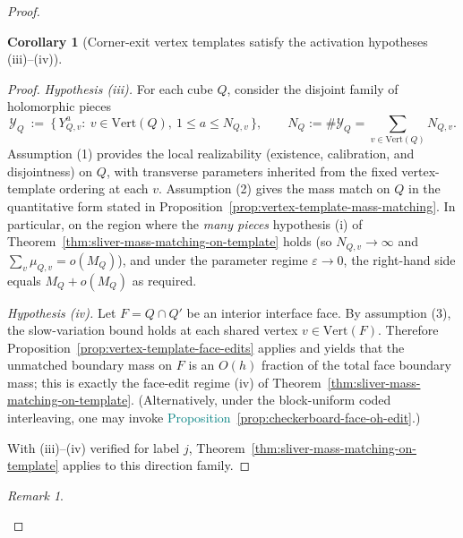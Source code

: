 \documentclass[11pt]{article}
\newcommand{\REVMZ}[1]{\textcolor{teal}{#1}}  %
\numberwithin{equation}{section}  %
\theoremstyle{plain}
\newtheorem{corollary}[theorem]{Corollary}
\theoremstyle{definition}
\theoremstyle{remark}
\newtheorem{remark}[theorem]{Remark}
\begin{document}
\begin{proof}
\begin{corollary}[Corner-exit vertex templates satisfy the activation hypotheses (iii)--(iv)]
\end{corollary}
\begin{proof}

\emph{Hypothesis \textnormal{(iii)}.}
For each cube $Q$, consider the disjoint family of holomorphic pieces
\[
\mathcal Y_Q\ :=\ \{\,Y_{Q,v}^a:\ v\in\mathrm{Vert}(Q),\ 1\le a\le N_{Q,v}\,\},
\qquad N_Q:=\#\mathcal Y_Q=\sum_{v\in\mathrm{Vert}(Q)}N_{Q,v}.
\]
Assumption \textnormal{(1)} provides the local realizability (existence, calibration, and disjointness) on $Q$,
with transverse parameters inherited from the fixed vertex-template ordering at each $v$.
Assumption \textnormal{(2)} gives the mass match on $Q$ in the quantitative form stated in
Proposition~\ref{prop:vertex-template-mass-matching}.
In particular, on the region where the \emph{many pieces} hypothesis \textnormal{(i)} of
Theorem~\ref{thm:sliver-mass-matching-on-template} holds (so $N_{Q,v}\to\infty$ and $\sum_v\mu_{Q,v}=o(M_Q)$),
and under the parameter regime $\varepsilon\to 0$, the right-hand side equals $M_Q+o(M_Q)$ as required.

\emph{Hypothesis \textnormal{(iv)}.}
Let $F=Q\cap Q'$ be an interior interface face.
By assumption \textnormal{(3)}, the slow-variation bound holds at each shared vertex $v\in\mathrm{Vert}(F)$.
Therefore Proposition~\ref{prop:vertex-template-face-edits} applies and yields that the unmatched boundary mass on $F$
is an $O(h)$ fraction of the total face boundary mass; this is exactly the face-edit regime \textnormal{(iv)} of
Theorem~\ref{thm:sliver-mass-matching-on-template}.
(Alternatively, under the block-uniform coded interleaving, one may invoke \REVMZ{Proposition~\ref{prop:checkerboard-face-oh-edit}}.)

With \textnormal{(iii)}--\textnormal{(iv)} verified for label $j$, Theorem~\ref{thm:sliver-mass-matching-on-template}
applies to this direction family.

\end{proof}


\begin{remark}\label{rem:L1-downstream-map}


\end{remark}
\end{proof}
\end{document}
